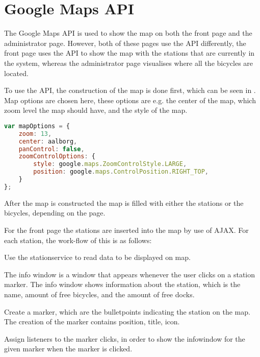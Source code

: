 \section{Google Maps API}\label{sec:googlemapsapi}
The Google Maps API \citep{misc:googlemapsapi} is used to show the map on both the front page and the administrator page.
However, both of these pages use the API differently, the front page uses the API to show the map with the stations that are currently in the system, whereas the administrator page visualises where all the bicycles are located.

To use the API, the construction of the map is done first, which can be seen in .
Map options are chosen here, these options are e.g. the center of the map, which zoom level the map should have, and the style of the map.

\begin{minipage}{\textwidth}
\begin{lstlisting}[caption={Construction of the map}, label={lst:mapoptions}, language=Javascript]
var mapOptions = {
	zoom: 13,
	center: aalborg,
	panControl: false,
    zoomControlOptions: {
		style: google.maps.ZoomControlStyle.LARGE,
		position: google.maps.ControlPosition.RIGHT_TOP,
	}
};
\end{lstlisting}
\end{minipage}

After the map is constructed the map is filled with either the stations or the bicycles, depending on the page.

For the front page the stations are inserted into the map by use of AJAX.
For each station, the work-flow of this is as follows:

\begin{description}[style=nextline]
	\item[Gather data]
	Use the stationservice to read data to be displayed on map.
	\item[Create info window]
	The info window is a window that appears whenever the user clicks on a station marker.
	The info window shows information about the station, which is the name, amount of free bicycles, and the amount of free docks.
	\item[Marker creation]
	Create a marker, which are the bulletpoints indicating the station on the map.
	The creation of the marker contains position, title, icon.
	\item[Assign listeners]
	Assign listeners to the marker clicks, in order to show the infowindow for the given marker when the marker is clicked.
\end{description}

